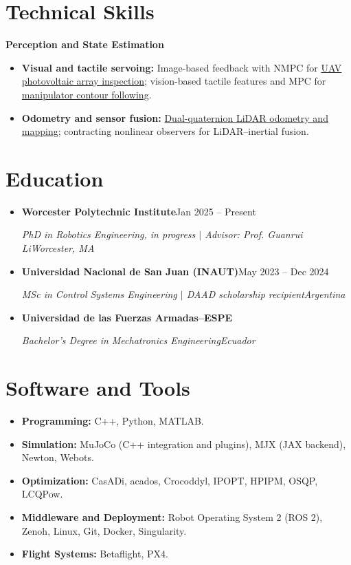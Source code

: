 \documentclass[letterpaper,11pt]{article}
\newcommand{\resumeSubheading}[4]{
  \vspace{-2pt}\item
    \textbf{#1}\enspace\textbar\enspace #2\\
    {\small\textit{#3\enspace\textbar\enspace #4}\par}\vspace{-5pt}
}
\newcommand{\resumeSubHeadingListStart}{\begin{itemize}[leftmargin=0.15in, label={}, topsep=3pt]}
\newcommand{\resumeSubHeadingListEnd}{\end{itemize}}
\begin{document}
\section{Technical Skills}
{\small\textbf{Perception and State Estimation}\par}
\begin{itemize}[leftmargin=0.22in, itemsep=2pt, parsep=0pt, topsep=4pt]
\small
\item \textbf{Visual and tactile servoing:} Image-based feedback with NMPC for \href{https://doi.org/10.1109/LRA.2024.3360876}{UAV photovoltaic array inspection}; vision-based tactile features and MPC for \href{https://doi.org/10.1109/LRA.2026.3698362}{manipulator contour following}.
\item \textbf{Odometry and sensor fusion:} \href{https://doi.org/10.1016/j.robot.2025.105009}{Dual-quaternion LiDAR odometry and mapping}; contracting nonlinear observers for LiDAR--inertial fusion.
\end{itemize}

\section{Education}
\resumeSubHeadingListStart
\resumeSubheading{Worcester Polytechnic Institute}{Jan 2025 -- Present}
{PhD in Robotics Engineering, in progress $|$ Advisor: Prof. Guanrui Li}{Worcester, MA}
\resumeSubheading{Universidad Nacional de San Juan (INAUT)}{May 2023 -- Dec 2024}
{MSc in Control Systems Engineering $|$ DAAD scholarship recipient}{Argentina}
\resumeSubheading{Universidad de las Fuerzas Armadas--ESPE}{2021}
{Bachelor's Degree in Mechatronics Engineering}{Ecuador}
\resumeSubHeadingListEnd

\section{Software and Tools}
\begin{itemize}[leftmargin=0.15in, label={}, itemsep=2pt, parsep=0pt, topsep=3pt]
\small
\item \textbf{Programming:} C++, Python, MATLAB.
\item \textbf{Simulation:} MuJoCo (C++ integration and plugins), MJX (JAX backend), Newton, Webots.
\item \textbf{Optimization:} CasADi, acados, Crocoddyl, IPOPT, HPIPM, OSQP, LCQPow.
\item \textbf{Middleware and Deployment:} Robot Operating System 2 (ROS 2), Zenoh, Linux, Git, Docker, Singularity.
\item \textbf{Flight Systems:} Betaflight, PX4.
\end{itemize}
\end{document}
